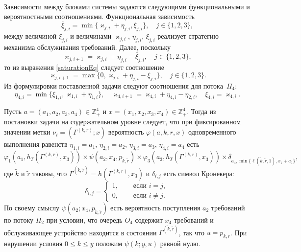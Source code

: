 Зависимости между блоками системы задаются следующими функциональными и вероятностными соотношениями. 
Функциональная зависимость
\begin{equation}
\overline{\xi}_{j,  i}=\min\{\varkappa_{j,  i}+\eta_{j,  i},  \xi_{j,  i}\},  \quad j \in \{1,  2,  3\}, 
\label{saturationEq}
\end{equation}
между величиной $\overline{\xi}_{j, i}$ и величинами $\varkappa_{j, i}$,  $\eta_{j, i}$,  $\xi_{j, i}$ реализует стратегию механизма обслуживания требований. Далее,  поскольку 
\begin{equation*}
\varkappa_{j,  i+1}=\varkappa_{j,  i}+\eta_{j,  i}-\overline{\xi}_{j,  i},  \quad  j \in \{1,  2,  3\}, 
\end{equation*}
то из выражения \eqref{saturationEq} следует соотношение
\begin{equation}
\varkappa_{j,  i+1}=\max\{{0,  \varkappa_{j,  i}+\eta_{j,  i}-\xi_{j,  i}}\},  \quad j \in \{1,  2,  3\}.
\label{queuesFunc}
\end{equation}
Из формулировки поставленной задачи следуют соотношения для потока~$\Pi_4$:
\begin{equation}
\eta_{4, i} = \min\{\xi_{1, i},  \varkappa_{1, i}+\eta_{1, i}\},  \quad \varkappa_{4, i+1}=\varkappa_{4, i}+\eta_{4, i}-\eta_{2, i},  \quad \xi_{4, i} = \varkappa_{4, i}.
\label{FourthFunc}
\end{equation}



Пусть $a=(a_1,  a_2,  a_3,  a_4) \in \mathbb{Z}_+^4$ и $x=(x_1,  x_2,  x_3,  x_4) \in \mathbb{Z}_+^4$. Тогда из постановки задачи на содержательном уровне следует,  что при фиксированном значении метки $\nu_i=(\Gamma^{(k,  r)}; x)$ вероятность $\varphi(a,  k,  r,  x)$ одновременного выполнения равенств $\eta_{1,  i}=a_1$,  $\eta_{2,  i}=a_2$,  $\eta_{3,  i}=a_3$,  $\eta_{4,  i}=a_4$ есть 
\begin{equation}
\varphi_1(a_1,  h_T(\Gamma^{(k,  r)},  x_3)) \times \psi(a_2,  x_4,  p_{\tilde{k},  \tilde{r}}) \times \varphi_3(a_3,  h_T(\Gamma^{(k,  r)},  x_3))
\times \delta_{a_4,  \min{\{\ell(\tilde{k},  \tilde{r},  1),  x_1+a_1}\}}, 
\label{conditionProbOne}
\end{equation}
где $\tilde{k}$ и $\tilde{r}$ таковы,  что $\Gamma^{(\tilde{k},  \tilde{r})}=h(\Gamma^{(k,  r)},  x_3)$ и $\delta_{i,  j}$ есть символ Кронекера:
$$
\delta_{i,  j}=
\begin{cases} 
1, & \quad \text{ если $i=j$, }\\
0, & \quad \text{ если $i\neq j$.}
\end{cases}
$$%
По своему смыслу $\psi(a_2; x_4, p_{\tilde{k},  \tilde{r}})$ есть вероятность поступления $a_2$ требований по потоку $\Pi_2$ при условии,  что очередь $O_4$ содержит $x_4$ требований и обслуживающее устройство находится в состоянии $\Gamma^{(\tilde{k},  \tilde{r})}$,  так что $u=p_{k,  r}$. При нарушении условия $ 0\leqslant k \leqslant y$ положим $\psi(k; y,  u)$ равной нулю.

